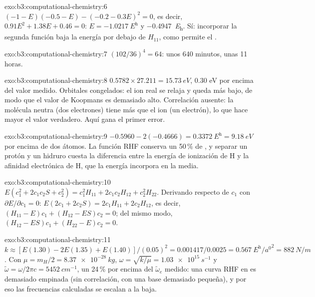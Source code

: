 \begin{solution}{exo:b3:computational-chemistry:6}
$(-1 - E)(-0.5 - E) - (-0.2 - 0.3E)^2 = 0$, es decir, $0.91E^2 + 1.38E + 0.46 = 0$:
$E = \qty{-1.0217}{\hartree}$ y \qty{-0.4947}{\hartree}. Sí: incorporar la
segunda función baja la energía por debajo de $H_{11}$, como permite el .
\end{solution}

\begin{solution}{exo:b3:computational-chemistry:7}
$(102/36)^4 = 64$: unos 640 minutos, unas 11 horas.
\end{solution}

\begin{solution}{exo:b3:computational-chemistry:8}
$0.5782 \times 27.211 = \qty{15.73}{eV}$, 0.30 eV por encima del valor medido. Orbitales
congelados: el ion real se relaja y queda más bajo, de modo que el valor de Koopmans es demasiado alto.
Correlación ausente: la molécula neutra (dos electrones) tiene más  que el ion (un electrón), lo que hace mayor el valor verdadero.
Aquí gana el primer error.
\end{solution}

\begin{solution}{exo:b3:computational-chemistry:9}
$-0.5960 - 2(-0.4666) = \qty{0.3372}{\hartree} = \qty{9.18}{eV}$ por encima de dos átomos.
La función RHF conserva un 50\,\% de , y separar un protón y un
hidruro cuesta la diferencia entre la energía de ionización de H y la
afinidad electrónica de H, que la energía incorpora en la media.
\end{solution}

\begin{solution}{exo:b3:computational-chemistry:10}
$E(c_1^2 + 2c_1c_2S + c_2^2) = c_1^2H_{11} + 2c_1c_2H_{12} + c_2^2H_{22}$.
Derivando respecto de $c_1$ con $\partial E/\partial c_1 = 0$:
$E(2c_1 + 2c_2S) = 2c_1H_{11} + 2c_2H_{12}$, es decir, $(H_{11} - E)c_1 + (H_{12} -
ES)c_2 = 0$; del mismo modo, $(H_{12} - ES)c_1 + (H_{22} - E)c_2 = 0$.
\end{solution}

\begin{solution}{exo:b3:computational-chemistry:11}
$k \approx [E(1.30) - 2E(1.35) + E(1.40)]/(0.05)^2 = 0.001417/0.0025 =
\qty{0.567}{\hartree\per\bohr\squared} = \qty{882}{N/m}$. Con $\mu = m_H/2 =
\qty{8.37e-28}{kg}$, $\omega = \sqrt{k/\mu} = \qty{1.03e15}{s^{-1}}$ y
$\tilde\omega = \omega/2\pi c = \qty{5452}{cm^{-1}}$, un 24\,\% por encima del
$\tilde\omega_e$ medido: una curva RHF en  es demasiado empinada (sin correlación, con una base
demasiado pequeña), y por eso las frecuencias calculadas se escalan a la baja.
\end{solution}

